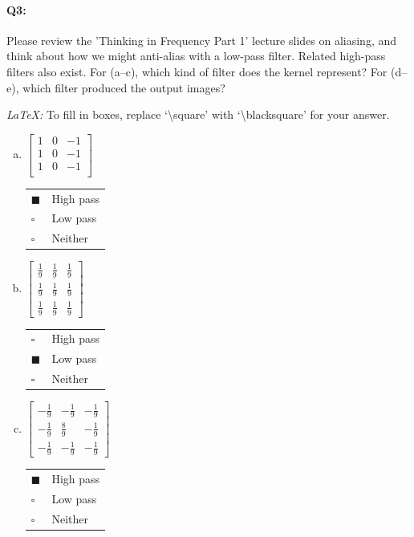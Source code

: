 
\pagebreak
\paragraph{Q3:} Please review the 'Thinking in Frequency Part 1' lecture slides on aliasing, and think about how we might anti-alias with a low-pass filter. Related high-pass filters also exist. For (a--c), which kind of filter does the kernel represent? For (d--e), which filter produced the output images?

\emph{LaTeX:} To fill in boxes, replace `\textbackslash square' with `\textbackslash blacksquare' for your answer.

\begin{enumerate}[(a)]
\item
 $\begin{bmatrix}
    1 & 0 & -1 \\
    1 & 0 & -1 \\
    1 & 0 & -1 \\
 \end{bmatrix}$
\begin{tabular}[h]{ll}
$\blacksquare$ & High pass \\
$\square$ & Low pass \\
$\square$ & Neither \\
\end{tabular}

\item
 $\begin{bmatrix}
    \frac{1}{9} & \frac{1}{9} & \frac{1}{9} \\
    \frac{1}{9} & \frac{1}{9} & \frac{1}{9} \\
    \frac{1}{9} & \frac{1}{9} & \frac{1}{9}
 \end{bmatrix}$
\begin{tabular}[h]{ll}
$\square$ & High pass \\
$\blacksquare$ & Low pass \\
$\square$ & Neither \\
\end{tabular}

\item
$\begin{bmatrix}
    -\frac{1}{9} & -\frac{1}{9} & -\frac{1}{9} \\
    -\frac{1}{9} & \frac{8}{9} & -\frac{1}{9} \\
    -\frac{1}{9} & -\frac{1}{9} & -\frac{1}{9}
  \end{bmatrix}$
\begin{tabular}[h]{ll}
$\blacksquare$ & High pass \\
$\square$ & Low pass \\
$\square$ & Neither \\
\end{tabular}


\end{enumerate}
